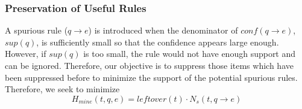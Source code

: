 %

\subsubsection{Preservation of Useful Rules}

A spurious rule ($q \rightarrow e$) is introduced when
the denominator of $conf(q \rightarrow e)$, $sup(q)$,
is sufficiently small so that the confidence appears large enough.
However, if $sup(q)$ is too small, the rule would not have enough
support and can be ignored.
Therefore, our objective is to suppress those items
which have been suppressed before to minimize the support of the
potential spurious rules.
%
Therefore, we seek to minimize
\[H_{mine}(t, q, e)=leftover(t)\cdot N_s(t, q\rightarrow e)\]
%

%
%

